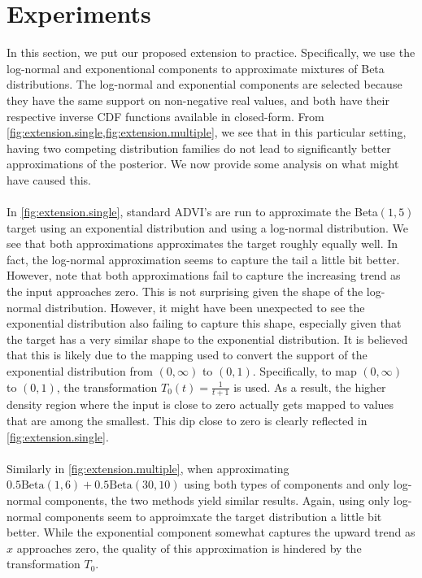 \section{Experiments} \label{sec:experiments}
In this section, we put our proposed extension to practice. Specifically, we use the log-normal and exponentional components to approximate mixtures of Beta distributions. The log-normal and exponential components are selected because they have the same support on non-negative real values, and both have their respective inverse CDF functions available in closed-form. From \cref{fig:extension.single,fig:extension.multiple}, we see that in this particular setting, having two competing distribution families do not lead to significantly better approximations of the posterior. We now provide some analysis on what might have caused this.\\\\
In \cref{fig:extension.single}, standard ADVI's are run to approximate the Beta$(1,5)$ target using an exponential distribution and using a log-normal distribution. We see that both approximations approximates the target roughly equally well. In fact, the log-normal approximation seems to capture the tail a little bit better. However, note that both approximations fail to capture the increasing trend as the input approaches zero. This is not surprising given the shape of the log-normal distribution. However, it might have been unexpected to see the exponential distribution also failing to capture this shape, especially given that the target has a very similar shape to the exponential distribution. It is believed that this is likely due to the mapping used to convert the support of the exponential distribution from $(0,\infty)$ to $(0,1)$. Specifically, to map $(0,\infty)$ to $(0,1)$, the transformation $T_0(t) = \frac{1}{t+1}$ is used. As a result, the higher density region where the input is close to zero actually gets mapped to values that are among the smallest. This dip close to zero is clearly reflected in \cref{fig:extension.single}.\\\\
Similarly in \cref{fig:extension.multiple}, when approximating $0.5\text{Beta}(1,6) + 0.5\text{Beta}(30,10)$ using both types of components and only log-normal components, the two methods yield similar results. Again, using only log-normal components seem to approimxate the target distribution a little bit better. While the exponential component somewhat captures the upward trend as $x$ approaches zero, the quality of this approximation is hindered by the transformation $T_0$.

